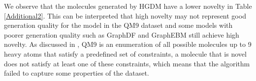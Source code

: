 \documentclass[letterpaper]{article} %
\begin{document}
We observe that the molecules generated by HGDM have a lower novelty in Table \ref{Additional2}. This can be interpreted that high novelty may not represent good generation quality for the model in the QM9 dataset and some models with poorer generation quality such as GraphDF and GraphEBM still achieve high novelty. As discussed in \cite{vignac2021top,hoogeboom2022equivariant}, QM9 is an enumeration of all possible molecules up to 9 heavy atoms that satisfy a predefined set of constraints, a molecule that is novel does not satisfy at least one of these constraints, which means that the algorithm failed to capture some properties of the dataset.
\begin{table}[htbp]
% 
  \centering
  \caption{\textbf{Generation results of HGDM on the Ego-small and the Community-small datasets.} Results of GDSS are taken from published papers \cite{jo2022score}. The best results are highlighted in bold (lower is better). We report the MMD distance between the test datasets and generated graphs with the standard deviation.}
\label{Additional0}
\end{table}
\end{document}
